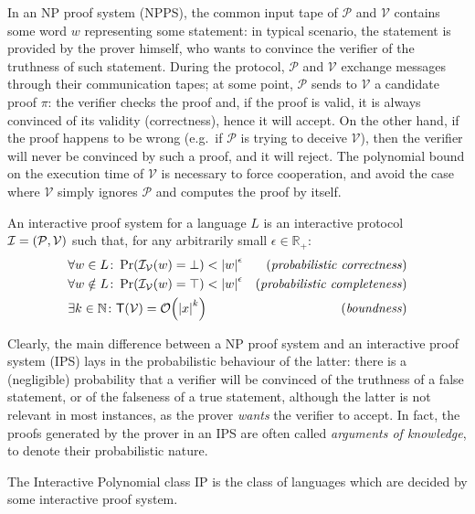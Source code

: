 In an \textsc{NP} proof system (\textsc{NP}PS), the common input tape of \(\mathcal{P}\) and 
\(\mathcal{V}\) contains some word \(w\) representing some statement: in typical scenario, the 
statement is provided by the prover himself, who wants to convince the verifier of the truthness of 
such statement.
During the protocol, \(\mathcal{P}\) and \(\mathcal{V}\) exchange messages through their 
communication tapes; at some point, \(\mathcal{P}\) sends to \(\mathcal{V}\) a candidate proof 
\(\pi \): the verifier checks the proof and, if the proof is valid, it is always convinced of its 
validity (correctness), hence it will accept. 
On the other hand, if the proof happens to be wrong (e.g.\ if \(\mathcal{P}\) is trying to deceive
\(\mathcal{V}\)), then the verifier will never be convinced by such a proof, and it will reject.
The polynomial bound on the execution time of \(\mathcal{V}\) is necessary to force cooperation, 
and avoid the case where \(\mathcal{V}\) simply ignores \(\mathcal{P}\) and computes the proof by 
itself.
\begin{definition}  
  An interactive proof system for a language \(L\) is an interactive protocol 
  \(\mathcal{I} = \left(\mathcal{P}, \mathcal{V}\right)\) such that, for any arbitrarily small 
  \(\epsilon \in \mathbb{R}_{+}\):
  \begin{align*}
    & \forall w \in L\colon \call{\Pr}{\call{\mathcal{I}_{\mathcal{V}}}{w} = \bot} < \abs{w}^{\epsilon}  
      & \textnormal{(\emph{probabilistic correctness})} \\
    & \forall w \notin L\colon \call{\Pr}{\call{\mathcal{I}_{\mathcal{V}}}{w} = \top} < \abs{w}^{\epsilon} 
      & \textnormal{(\emph{probabilistic completeness})} \\
    & \exists k \in \mathbb{N}\colon \call{\Time}{\mathcal{V}} = \BigO{\abs{x}^k} & 
    \textnormal{(\emph{boundness})}
  \end{align*}
\end{definition}

Clearly, the main difference between a NP proof system and an interactive proof system (IPS) lays 
in the probabilistic behaviour of the latter: there is a (negligible) probability that a verifier 
will be convinced of the truthness of a false statement, or of the falseness of a true statement, 
although the latter is not relevant in most instances, as the prover \emph{wants} the verifier 
to accept.
In fact, the proofs generated by the prover in an IPS are often called 
\emph{arguments of knowledge}, to denote their probabilistic nature. 
\begin{definition}
  The Interactive Polynomial class \textsc{IP} is the class of languages which are decided by some
  interactive proof system.
\end{definition}

